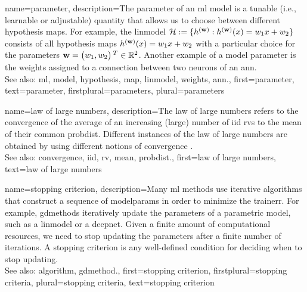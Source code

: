 {name={parameter},
	description={The parameter of an \gls{ml} \gls{model} is a tunable (i.e., learnable or adjustable) quantity that 
		allows us to choose between different \gls{hypothesis} \glspl{map}. For example, the \gls{linmodel} 
		$\mathcal{H} := \{h^{({\bf w})}: h^{({\bf w})}(x)= w_{1} x + w_{2}\}$ 
		consists of all \gls{hypothesis} \glspl{map} $h^{({\bf w})}(x)= w_{1} x + w_{2}$ 
		with a particular choice for the parameters ${\bf w} = \big(w_{1},w_{2}\big)\,^{T} \in \mathbb{R}^{2}$. 
		Another example of a \gls{model} parameter is the \gls{weights} assigned to a connection between two neurons of an \gls{ann}.
				\\
		See also: \gls{ml}, \gls{model}, \gls{hypothesis}, \gls{map}, \gls{linmodel}, \gls{weights}, \gls{ann}.},
	first={parameter},
	text={parameter},
	firstplural={parameters}, 
 	plural={parameters}
}

{name={law of large numbers},
	description={The law of large numbers refers to the 
		\gls{convergence} of the average of an increasing (large) number of \gls{iid} \glspl{rv} 
		to the \gls{mean} of their common \gls{probdist}. Different instances of the 
		law of large numbers are obtained by using different notions of \gls{convergence} \cite{papoulis}.
				\\
		See also: \gls{convergence}, \gls{iid}, \gls{rv}, \gls{mean}, \gls{probdist}.},
	first={law of large numbers},
	text={law of large numbers}
}
    
{name={stopping criterion},
	description={Many \gls{ml} methods use iterative \glspl{algorithm} 
		that construct a sequence of \glspl{modelparam} in order to minimize the \gls{trainerr}. 
		For example, \glspl{gdmethod} iteratively update the \glspl{parameter} of a parametric \gls{model}, 
		such as a \gls{linmodel} or a \gls{deepnet}. Given a finite amount of computational 
		resources, we need to stop updating the \glspl{parameter} after a finite number of iterations. 
		A stopping criterion is any well-defined condition for deciding when to stop updating.
				\\
		See also: \gls{algorithm}, \gls{gdmethod}.},
	first={stopping criterion},
	firstplural={stopping criteria},
	plural={stopping criteria}, 
	text={stopping criterion}
}

